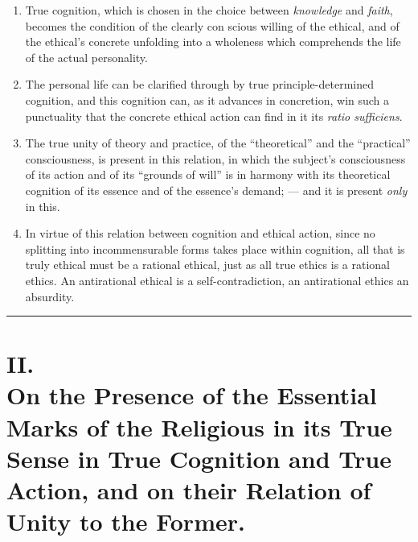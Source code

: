 \documentclass[12pt,a4paper]{book}
\begin{document}
\begin{enumerate}[label=\arabic*., leftmargin=*, labelsep=1em,
                  topsep=0.35\baselineskip, itemsep=0.35\baselineskip]
\item True cognition, which is chosen in the choice between \emph{knowledge}
  and \emph{faith}, becomes the condition of the clearly con\-%
  scious willing of the ethical, and of the ethical's concrete unfolding into
  a wholeness which comprehends the life of the actual personality.
\item The personal life can be clarified through by true principle-determined
  cognition, and this cognition can, as it advances in concretion, win such a
  punctuality that the concrete ethical action can find in it its
  \textit{ratio sufficiens}.
\item The true unity of theory and practice, of the ``theoretical'' and the
  ``practical'' consciousness, is present in this relation, in which the
  subject's consciousness of its action and of its ``grounds of will'' is in
  harmony with its theoretical cognition of its essence and of the essence's
  demand; --- and it is present \emph{only} in this.
\item In virtue of this relation between cognition and ethical action, since
  no splitting into incommensurable forms takes place within cognition, all
  that is truly ethical must be a rational ethical, just as all true ethics is
  a rational ethics. An antirational ethical is a self-contradiction, an
  antirational ethics an absurdity.
\end{enumerate}

\begin{center}\rule{2cm}{0.4pt}\end{center}

\chapter*{II.\\ On the Presence of the Essential Marks of the Religious in its True Sense in True Cognition and True Action, and on their Relation of Unity to the Former.}
\end{document}
